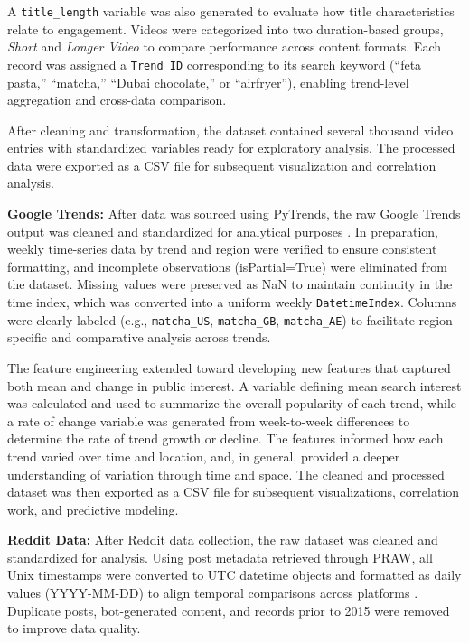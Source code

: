\documentclass{article}
\begin{document}
A \texttt{title\_length} variable was also generated to evaluate how title characteristics relate to engagement. Videos were categorized into two duration-based groups, \textit{Short} and \textit{Longer Video} to compare performance across content formats. Each record was assigned a \texttt{Trend ID} corresponding to its search keyword (“feta pasta,” “matcha,” “Dubai chocolate,” or “airfryer”), enabling trend-level aggregation and cross-data comparison.

After cleaning and transformation, the dataset contained several thousand video entries with standardized variables ready for exploratory analysis. The processed data were exported as a CSV file for subsequent visualization and correlation analysis.


\textbf{Google Trends: }After data was sourced using PyTrends, the raw Google Trends output was cleaned and standardized for analytical purposes \citep{pytrends_api}. In preparation, weekly time-series data by trend and region were verified to ensure consistent formatting, and incomplete observations (isPartial=True) were eliminated from the dataset. Missing values were preserved as NaN to maintain continuity in the time index, which was converted into a uniform weekly \texttt{DatetimeIndex}. Columns were clearly labeled (e.g., \texttt{matcha\_US}, \texttt{matcha\_GB}, \texttt{matcha\_AE}) to facilitate region-specific and comparative analysis across trends.

The feature engineering extended toward developing new features that captured both mean and change in public interest. A variable defining mean search interest was calculated and used to summarize the overall popularity of each trend, while a rate of change variable was generated from week-to-week differences to determine the rate of trend growth or decline. The features informed how each trend varied over time and location, and, in general, provided a deeper understanding of variation through time and space. The cleaned and processed dataset was then exported as a CSV file for subsequent visualizations, correlation work, and predictive modeling.

\textbf{Reddit Data: }After Reddit data collection, the raw dataset was cleaned and standardized for analysis. Using post metadata retrieved through PRAW, all Unix timestamps were converted to UTC datetime objects and formatted as daily values (YYYY-MM-DD) to align temporal comparisons across platforms \citep{reddit_api_praw}. Duplicate posts, bot-generated content, and records prior to 2015 were removed to improve data quality.
\end{document}
